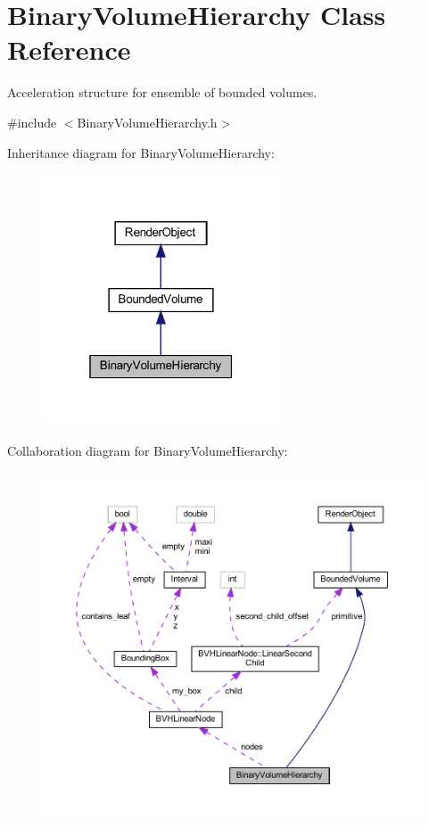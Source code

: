 \hypertarget{classBinaryVolumeHierarchy}{}\section{Binary\+Volume\+Hierarchy Class Reference}
\label{classBinaryVolumeHierarchy}


Acceleration structure for ensemble of bounded volumes.  




{\ttfamily \#include $<$Binary\+Volume\+Hierarchy.\+h$>$}



Inheritance diagram for Binary\+Volume\+Hierarchy\+:
\nopagebreak
\begin{figure}[H]
\begin{center}
\leavevmode
\includegraphics[width=199pt]{classBinaryVolumeHierarchy__inherit__graph}
\end{center}
\end{figure}


Collaboration diagram for Binary\+Volume\+Hierarchy\+:
\nopagebreak
\begin{figure}[H]
\begin{center}
\leavevmode
\includegraphics[width=350pt]{classBinaryVolumeHierarchy__coll__graph}
\end{center}
\end{figure}
